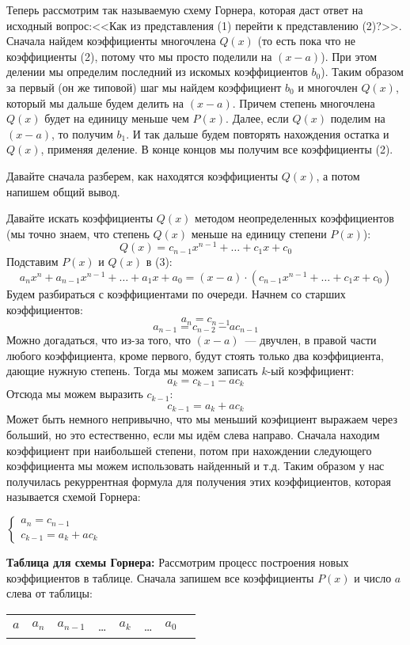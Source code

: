 \documentclass[russian]{lecture-notes}
\theoremstyle{definition}
\begin{document}
    Теперь рассмотрим так называемую схему Горнера, которая даст ответ на исходный вопрос:<<Как из представления (1) перейти к представлению (2)?>>. Сначала найдем коэффициенты многочлена $Q(x)$ (то есть пока что не коэффициенты (2), потому что мы просто поделили на $(x-a)$). При этом делении мы определим последний из искомых коэффициентов $b_0$). Таким образом за первый (он же типовой) шаг мы найдем коэффициент $b_0$ и многочлен $Q(x)$, который мы дальше будем делить на $(x-a)$. Причем степень многочлена $Q(x)$ будет на единицу меньше чем $P(x)$. Далее, если $Q(x)$ поделим на $(x-a)$, то получим $b_1$. И так дальше будем повторять нахождения остатка и $Q(x)$, применяя деление. В конце концов мы получим все коэффициенты (2).

    Давайте сначала разберем, как находятся коэффициенты $Q(x)$, а потом напишем общий вывод.

    Давайте искать коэффициенты $Q(x)$ методом неопределенных коэффициентов (мы точно знаем, что степень $Q(x)$ меньше на единицу степени $P(x)$):
    \[
        Q(x) = c_{n-1}x^{n-1} + \ldots + c_1x + c_0
    \]
    Подставим $P(x)$ и $Q(x)$ в (3):
    \[
        a_nx^n + a_{n-1}x^{n-1} + \ldots + a_1x + a_0 = (x-a) \cdot (c_{n-1}x^{n-1} + \ldots + c_1x + c_0)
    \]
    Будем разбираться с коэффициентами по очереди. Начнем со старших коэффициентов:
    \[
        a_n = c_{n-1}
    \]
    \[
        a_{n-1} = c_{n-2} - ac_{n-1}
    \]
    Можно догадаться, что из-за того, что $(x-a)$~--- двучлен, в правой части любого коэффициента, кроме первого, будут стоять только два коэффициента, дающие нужную степень. Тогда мы можем записать $k$-ый коэффициент:
    \[
        a_k = c_{k-1} - ac_{k}
    \]
    Отсюда мы можем выразить $c_{k-1}$:
    \[
        c_{k-1} = a_k + ac_k
    \]
    Может быть немного непривычно, что мы меньший коэфициент выражаем через больший, но это естественно, если мы идём слева направо. Сначала находим коэффициент при наибольшей степени, потом при нахождении следующего коэффициента мы можем использовать найденный и т.д. Таким образом у нас получилась рекуррентная формула для получения этих коэффициентов, которая называется схемой Горнера:

    $\begin{cases}
         a_n = c_{n-1}\\
         c_{k-1} = a_k + ac_k
    \end{cases}$

    \noindent\textbf{Таблица для схемы Горнера:}
    Рассмотрим процесс построения новых коэффициентов в таблице.
    Сначала запишем все коэффициенты $P(x)$ и число $a$ слева от таблицы:
    \begin{table}[H]
        \centering
        \begin{tabular}{c|c|c|c|c|c|c|c}
            $a$ & $a_n$ & $a_{n-1}$ & \ldots & $a_k$ & \ldots & $a_0$
        \end{tabular}
    \end{table}
\end{document}
